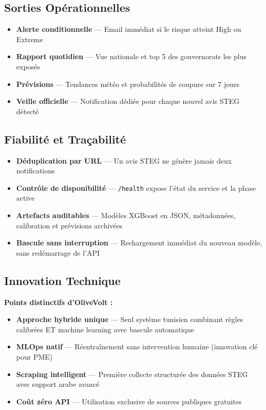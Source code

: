 \documentclass[10pt,a4paper]{article}
\begin{document}
\subsection*{Sorties Opérationnelles}

\begin{itemize}
\item \textbf{Alerte conditionnelle} — Email immédiat si le risque atteint High ou Extreme
\item \textbf{Rapport quotidien} — Vue nationale et top 5 des gouvernorats les plus exposés
\item \textbf{Prévisions} — Tendances météo et probabilités de coupure sur 7 jours
\item \textbf{Veille officielle} — Notification dédiée pour chaque nouvel avis STEG détecté
\end{itemize}
\vspace{0.3cm}

\subsection*{Fiabilité et Traçabilité}

\begin{itemize}
\item \textbf{Déduplication par URL} — Un avis STEG ne génère jamais deux notifications
\item \textbf{Contrôle de disponibilité} — \texttt{/health} expose l'état du service et la phase active
\item \textbf{Artefacts auditables} — Modèles XGBoost en JSON, métadonnées, calibration et prévisions archivées
\item \textbf{Bascule sans interruption} — Rechargement immédiat du nouveau modèle, sans redémarrage de l'API
\end{itemize}
\vspace{0.3cm}

\subsection*{Innovation Technique}

\textbf{Points distinctifs d'OliveVolt :}
\begin{itemize}
\item \textbf{Approche hybride unique} — Seul système tunisien combinant règles calibrées ET machine learning avec bascule automatique
\item \textbf{MLOps natif} — Réentraînement sans intervention humaine (innovation clé pour PME)
\item \textbf{Scraping intelligent} — Première collecte structurée des données STEG avec support arabe avancé
\item \textbf{Coût zéro API} — Utilisation exclusive de sources publiques gratuites
\end{itemize}

\vspace{0.15cm}
\end{document}
